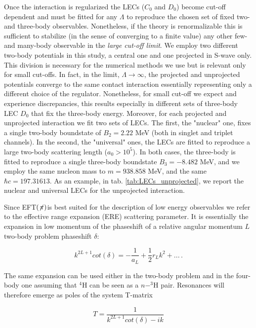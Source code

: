 \documentclass[aps,onecolumn,preprintnumbers,amsmath,amssymb,nofootinbib,superscriptaddress,notitlepage]{revtex4-1}
\newcommand{\eftnopi}{\mbox{EFT$(\not \! \pi)$}}
\begin{document}
Once the interaction is regularized the LECs ($C_0$ and $D_0$) become cut-off dependent and must be fitted for any $\Lambda$ to reproduce the chosen set of fixed two- and three-body observables.
Nonetheless, if the theory is renormalizable this is sufficient to stabilize (in the sense of converging to a finite value) any other few- and many-body observable in the \textit{large cut-off limit}.
We employ two different two-body potentials in this study, a central one and one projected in S-wave only. 
This division is necessary for the numerical methods we use but is relevant only for small cut-offs.
In fact, in the limit, $\Lambda\rightarrow\infty$, the projected and unprojected potentials converge to the same contact interaction essentially representing only a different choice of the regulator.
Nonetheless, for small cut-off we expect and experience discrepancies, this results especially in different sets of three-body LEC $D_0$ that fix the three-body energy.
Moreover, for each projected and unprojected interaction we fit two sets of LECs.
The first, the "nuclear" one, fixes a single two-body boundstate of $B_2=2.22$ MeV (both in singlet and triplet channels).
In the second, the "universal" ones, the LECs are fitted to reproduce a large two-body scattering length ($a_0>10^5$).
In both cases, the three-body is fitted to reproduce a single three-body boundstate $B_3=-8.482$ MeV, and we employ the same nucleon mass to $m=938.858$ MeV, and the same $\hbar c= 197.31613$.
As an example, in tab. \ref{tab:LECs_unprojected}, we report the nuclear and universal LECs for the unprojected interaction.
%

%
Since \eftnopi is best suited for the description of low energy observables we refer to the effective range expansion (ERE) scattering parameter. 
It is essentially the expansion in low momentum of the phaseshift of a relative angular momentum $L$ two-body problem phaseshift $\delta$:

\begin{equation}
    k^{2L+1}cot(\delta)=-\frac{1}{a_L}+\frac{1}{2}r_L k^2 + ... \, .
\end{equation}

The same expansion can be used either in the two-body problem and in the four-body one assuming that $^4$H can be seen as a $n-^3$H pair.
Resonances will therefore emerge as poles of the system T-matrix

\begin{equation}
T = \frac{1}{k^{2L+1}cot(\delta)-ik}    
\end{equation}
\end{document}
